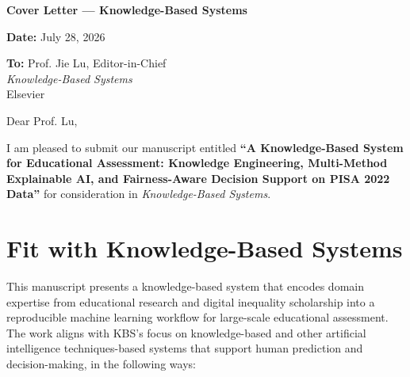 \documentclass[12pt]{article}
\begin{document}
\begin{center}
{\Large \textbf{Cover Letter — Knowledge-Based Systems}}
\end{center}

\vspace{12pt}

\textbf{Date:} July 28, 2026

\vspace{6pt}

\textbf{To:} Prof. Jie Lu, Editor-in-Chief \\
\textit{Knowledge-Based Systems} \\
Elsevier

\vspace{12pt}

Dear Prof. Lu,

I am pleased to submit our manuscript entitled \textbf{``A Knowledge-Based System for Educational Assessment: Knowledge Engineering, Multi-Method Explainable AI, and Fairness-Aware Decision Support on PISA 2022 Data''} for consideration in \textit{Knowledge-Based Systems}.

\section*{Fit with Knowledge-Based Systems}

This manuscript presents a knowledge-based system that encodes domain expertise from educational research and digital inequality scholarship into a reproducible machine learning workflow for large-scale educational assessment. The work aligns with KBS's focus on knowledge-based and other artificial intelligence techniques-based systems that support human prediction and decision-making, in the following ways:
\end{document}
